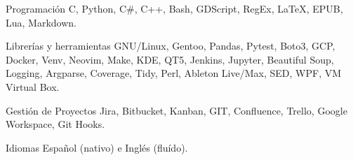 

\begin{cvskills}

  \cvskill
    {Programación} %
    {C, Python, C\#, C++, Bash, GDScript, RegEx, LaTeX, EPUB, Lua, Markdown.} %

  \cvskill
    {Librerías y herramientas}
    {GNU/Linux, Gentoo, Pandas, Pytest, Boto3, GCP, Docker, Venv, Neovim, Make, KDE, QT5, Jenkins, Jupyter,}
  \cvskill
    {}
    {Beautiful Soup, Logging, Argparse, Coverage, Tidy, Perl, Ableton Live/Max, SED, WPF, VM Virtual Box.}

  \cvskill
    {Gestión de Proyectos}
    {Jira, Bitbucket, Kanban, GIT, Confluence, Trello, Google Workspace, Git Hooks.}

  \cvskill
    {Idiomas}
    {Español (nativo) e Inglés (fluído).}


\end{cvskills}
